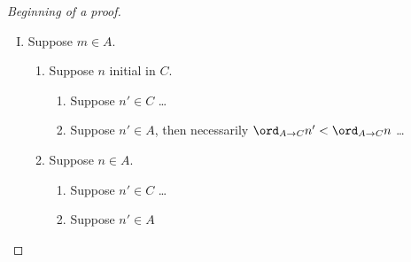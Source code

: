 \begin{proof}[Beginning of a proof]
\begin{enumerate}[I.]
\begin{enumerate}
Suppose that $n' \in \pview{u\filter A,C}$, then by lemma \ref{lem:middlepomove}
there must be some $\pomove$-move $\gamma$ 
occurring between $n'$ and $m$ and pointing before $n'$
such that $\gamma \in \pview{u\filter B,C}$ and $n' \in \pview{u_{\leq \delta} \filter A,B}$:
$$ 
\begin{array}{ccccc}
A & \stackrel\sigma{\longrightarrow} & B & \stackrel\mu{\longrightarrow} & C \\
&\vdots&&\vdots\\
&&&& \rnode{n}{n}\omove \\
&\vdots&\rnode{gj}{\cdot}&\vdots\\
n' \omove \\
&\vdots&&\vdots  \\
&&\rnode{g}{\gamma} \pomove \\
&\vdots&&\vdots  \\
&&&&\rnode{m}{m} \pmove \\
\end{array}
\ncarc[arcangleA=30,arcangleB=30]{->}{m}{n}
\ncarc[arcangleA=30,arcangleB=30]{->}{g}{gj}
 $$  

Since $n'$ is visible from $\gamma$ in $A,B$
but $\gamma$ is justified by a move occurring before $n'$,
by P-incrementally-justification of $\sigma$
we must have:
$$ \ord_{A\rightarrow B} n'  \leq \ord_{A\rightarrow B} \gamma \ .$$
Similarly, since $\gamma$ is visible from $m$ in $B,C$ and
$m$ is justified by $n$ occurring before $\gamma$, by P-incrementally-justification of $\mu$ we have:
$$ \ord_{B\rightarrow C} \gamma  \leq \ord_{B\rightarrow C} m \ .$$

Hence since $\ord_{B\rightarrow C} m = \ord_{A\rightarrow C} m$ and $\ord_{A\rightarrow B} m = \ord_{A\rightarrow C} m$ we conclude:
$$ \ord_{A\rightarrow C} n' \leq \ord_{A\rightarrow C} m \ .$$
\end{enumerate}

\item \label{case:mA} Suppose $m\in A$.
\begin{enumerate}
\item \label{case:mAnC} Suppose  $n$ initial in $C$.
	\begin{enumerate}
	\item Suppose $n'\in C$ \ldots
	\item Suppose  $n'\in A$, then necessarily $\ord_{A\rightarrow C}{n'} <
\ord_{A\rightarrow C}{n}$ \ldots
	\end{enumerate}
\item \label{case:mAnA} Suppose $n\in A$.
	\begin{enumerate}
	\item \label{case:mAnAnpC} Suppose $n'\in C$ \ldots 
	\item \label{case:mAnAnpA} Suppose $n'\in A$
 

\end{enumerate}
\end{enumerate}
\end{enumerate}
\end{proof}
